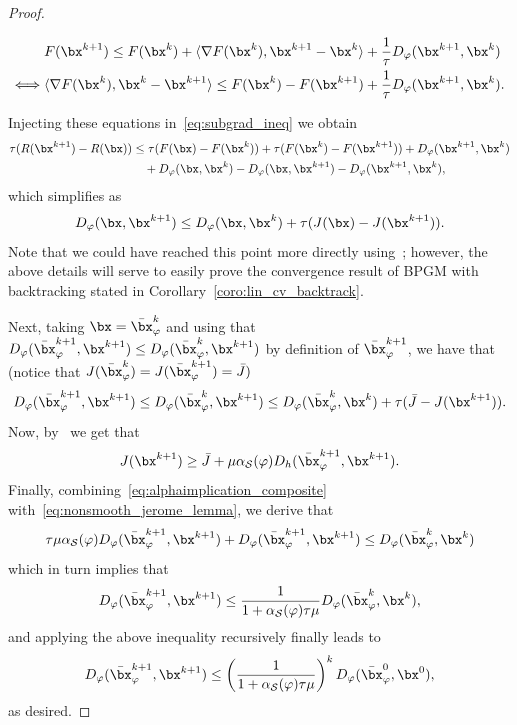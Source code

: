 \documentclass[11pt]{amsart}
\begin{document}
\begin{proof}
\begin{itemize}
    \begin{align}
        & F(\bx^{k+1}) \leq F(\bx^k) + \langle \nabla F(\bx^k), \bx^{k+1} - \bx^k\rangle + \frac{1}{\tau}D_\varphi (\bx^{k+1},\bx^k) \label{eq:rel_smooth_proof} \\
        \Longleftrightarrow \; & \langle \nabla F(\bx^k), \bx^{k} - \bx^{k+1}\rangle \leq F(\bx^k) - F(\bx^{k+1})  + \frac{1}{\tau}D_\varphi (\bx^{k+1},\bx^k). \notag  
    \end{align}    
\end{itemize}
Injecting these equations in~\eqref{eq:subgrad_ineq} we obtain
$$
\begin{aligned}
    \tau( R(\bx^{k+1}) - R(\bx)) &\leq \tau (F(\bx) - F(\bx^{k})) + \tau (F(\bx^k) - F(\bx^{k+1})) + D_\varphi (\bx^{k+1},\bx^k) \\
    &\quad + D_\varphi(\bx,\bx^k) - D_\varphi(\bx,\bx^{k+1}) - D_\varphi(\bx^{k+1},\bx^k),
\end{aligned}
$$
which simplifies as
$$
D_\varphi(\bx,\bx^{k+1}) \leq D_\varphi(\bx,\bx^k) + \tau (J(\bx) - J(\bx^{k+1})). 
$$
Note that we could have reached this point more directly using~\cite[Lemma 5]{bauschke2017descent}; however, the above details will serve to easily prove the convergence result of BPGM with backtracking stated in Corollary~\ref{coro:lin_cv_backtrack}. 

Next, taking $\bx=\bar\bx^k_{\varphi}$ and using that $D_{\varphi}(\bar \bx^{k+1}_{\varphi}, \bx^{k+1})\leq D_{\varphi}(\bar \bx^{k}_{\varphi}, \bx^{k+1})$ by  definition of $\bar\bx^{k+1}_{\varphi}$, we have that (notice that $J(\bar\bx^k_{\varphi})=J(\bar\bx^{k+1}_{\varphi})= \bar J)$
\begin{equation}\label{eq:nonsmooth_jerome_lemma}
D_{\varphi}(\bar \bx^{k+1}_{\varphi}, \bx^{k+1})\leq D_{\varphi}(\bar \bx^{k}_{\varphi}, \bx^{k+1})\leq D_{\varphi}(\bar\bx^k_{\varphi},\bx^k)+\tau (\bar J - J(\bx^{k+1})).
\end{equation}
Now, by~ we get that
\begin{equation}\label{eq:alphaimplication_composite}
J(\bx^{k+1})\geq \bar J + \mu \alpha_\mathcal{S}(\varphi)D_{h}(\bar\bx^{k+1}_{\varphi},\bx^{k+1}).
\end{equation}
Finally, combining~\cref{eq:alphaimplication_composite} with~\cref{eq:nonsmooth_jerome_lemma}, we derive that
\begin{equation}\label{eq:non_sym_lin_cv_composite}
\tau\mu \alpha_\mathcal{S}(\varphi) D_{\varphi}(\bar\bx^{k+1}_{\varphi}, \bx^{k+1})+D_{\varphi}(\bar \bx^{k+1}_{\varphi}, \bx^{k+1})\leq  D_{\varphi}(\bar\bx^k_{\varphi},\bx^k)    
\end{equation}
which in turn implies that
$$
D_{\varphi}(\bar \bx^{k+1}_{\varphi}, \bx^{k+1})\leq \frac{1}{1+\alpha_\mathcal{S}(\varphi)\tau\mu}D_{\varphi}(\bar \bx^k_{\varphi}, \bx^k),
$$
and applying the above inequality recursively finally leads to
\begin{equation}\label{eq: lin conv D varphi}
    D_{\varphi}(\bar\bx^{k+1}_{\varphi},\bx^{k+1})\leq \left(\frac{1}{1+\alpha_\mathcal{S}(\varphi)\tau\mu}\right)^k D_{\varphi}(\bar\bx^{0}_{\varphi},\bx^{0}),
\end{equation}
as desired. 


\end{proof}
\end{document}
